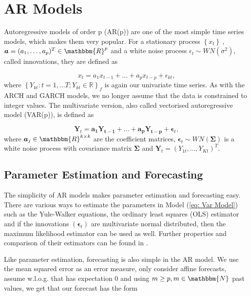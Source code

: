 \section{AR Models}
\label{sec: Ar Models}

Autoregressive models of order p (AR(p))  are one of the most simple time series models, which makes them very popular. For a stationary process $\left\{x_t\right\}\ $, $\bm{a}=(a_1,\ldots,a_p)^T \in \mathbbm{R}^p$ and a white noise process $\epsilon_{t} \sim WN(\sigma^2)$, called innovations, they are defined as 

\begin{equation}
x_{t} = a_1x_{t-1} + \ldots + a_p x_{t-p} + \epsilon_{kt},
\label{eq: Ar model}
\end{equation}
%
where $\left\{Y_{kt}:t=1,\ldots T; Y_{kt} \in \mathbb{R}\right\}_f$ is again our univariate time series. As with the ARCH and GARCH models, we no longer assume that the data is constrained to integer values. The multivariate version, also called vectorised autoregressive model (VAR(p)), is defined as 

\begin{equation}
\bm{Y}_{t} = \bm{a_1 Y_{t-1}}+ \ldots + \bm{a_p Y_{t-p}} + \bm{\epsilon}_{t},
\label{eq: Var Model}
\end{equation}
%
where $\bm{a}_j \in \mathbbm{R}^{k \times k}$ are the coefficient matrices, $\bm{\epsilon}_t \sim WN(\bm{\Sigma})$ is a white noise process with covariance matrix $\bm{\Sigma}$ and $\bm{Y}_t = (Y_{1t},\ldots,Y_{Kt})^T$.%

\subsection{Parameter Estimation and Forecasting}
\label{sec: AR Estimation and Forecasting}

The simplicity of AR models makes parameter estimation and forecasting easy. There are various ways to estimate the parameters in Model (\ref{eq: Var Model}) such as the Yule-Walker equations, the ordinary least squares (OLS) estimator and if the innovations $(\bm{\epsilon}_t)$ are multivariate normal distributed, then the maximum likelihood estimator can be used as well. Further properties and comparison of their estimators can be found in \textcite{Scherrer:2021}. 

Like parameter estimation, forecasting is also simple in the AR model. We use the mean squared error as an error measure, only consider affine forecasts, assume w.l.o.g. that  has expectation 0 and using $m\geq p,m \in \mathbbm{N}$ past values, we get that our forecast has the form 

